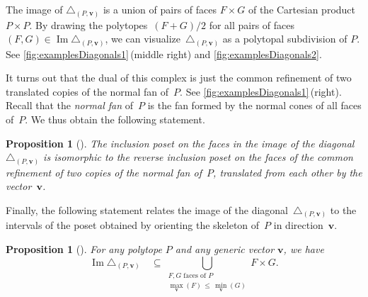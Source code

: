 \documentclass{amsart}
\newcommand{\darkblue}{\color{darkblue}} %
\newtheorem{proposition}[theorem]{Proposition}
\theoremstyle{definition}
\renewcommand{\b}[1]{{\boldsymbol{#1}}} %
\DeclareMathOperator{\Ima}{Im} %
\newcommand{\defn}[1]{\textsl{\darkblue #1}} %
\renewcommand{\b}[1]{\boldsymbol{#1}} %
\begin{document}
The image of $\triangle_{(P,\b{v})}$ is a union of pairs of faces $F \times G$ of the Cartesian product~$P \times P$.
By drawing the polytopes~${(F+G)/2}$ for all pairs of faces $(F,G) \in \Ima \triangle_{(P,\b{v})}$, we can visualize~$\triangle_{(P,\b{v})}$ as a polytopal subdivision of $P$.
See \cref{fig:examplesDiagonals1}\,(middle right) and \cref{fig:examplesDiagonals2}.

It turns out that the dual of this complex is just the common refinement of two translated copies of the normal fan of~$P$.
See \cref{fig:examplesDiagonals1}\,(right).
Recall that the \defn{normal fan} of~$P$ is the fan formed by the normal cones of all faces of~$P$.
We thus obtain the following statement.

\begin{proposition}[{\cite[Coro.~1.4]{LaplanteAnfossi}}]
\label{prop:diagonalCommonRefinement}
The inclusion poset on the faces in the image of the diagonal~$\triangle_{(P,\b{v})}$ is isomorphic to the reverse inclusion poset on the faces of the common refinement of two copies of the normal fan of~$P$, translated from each other by the vector~$\b{v}$. 
\end{proposition}

Finally, the following statement relates the image of the diagonal~$\triangle_{(P, \b{v})}$ to the intervals of the poset obtained by orienting the skeleton of~$P$ in direction~$\b{v}$.

\begin{proposition}[{\cite[Prop. 1.17]{LaplanteAnfossi}}]
\label{prop:magicalFormula}
For any polytope $P$ and any generic vector $\b{v}$, we have
\begin{equation}
\label{eq:magique}
\Ima\triangle_{(P, \b{v})} \quad \subseteq \bigcup_{\substack{F,G \text{ faces of } P \\ \max_{\b{v}}(F) \, \le \, \min_{\b{v}}(G)}} F \times G .
\end{equation}
\end{proposition}
\end{document}
